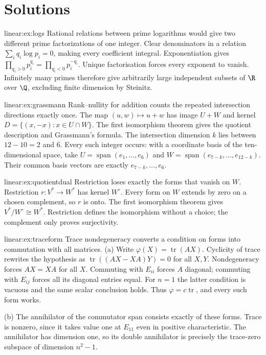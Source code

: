 \section{Solutions}
\begin{solution}{linear:ex:logs}
\idea Rational relations between prime logarithms would give two different prime factorizations of one integer.
\writeup Clear denominators in a relation $\sum_iq_i\log p_i=0$, making every coefficient integral. Exponentiation gives $\prod_{q_i>0}p_i^{q_i}=\prod_{q_i<0}p_i^{-q_i}$. Unique factorisation forces every exponent to vanish. Infinitely many primes therefore give arbitrarily large independent subsets of $\R$ over $\Q$, excluding finite dimension by Steinitz.
\end{solution}
\begin{solution}{linear:ex:grassmann}
\idea Rank--nullity for addition counts the repeated intersection directions exactly once.
\writeup The map $(u,w)\mapsto u+w$ has image $U+W$ and kernel $D=\{(x,-x):x\in U\cap W\}$. The first isomorphism theorem gives the quotient description and Grassmann's formula. The intersection dimension $k$ lies between $12-10=2$ and $6$. Every such integer occurs: with a coordinate basis of the ten-dimensional space, take $U=\operatorname{span}(e_1,\ldots,e_6)$ and $W=\operatorname{span}(e_{7-k},\ldots,e_{12-k})$. Their common basis vectors are exactly $e_{7-k},\ldots,e_6$.
\end{solution}
\begin{solution}{linear:ex:quotientdual}
\idea Restriction loses exactly the forms that vanish on $W$.
\writeup Restriction $r:V^*\to W^*$ has kernel $W^\circ$. Every form on $W$ extends by zero on a chosen complement, so $r$ is onto. The first isomorphism theorem gives $V^*/W^\circ\cong W^*$. Restriction defines the isomorphism without a choice; the complement only proves surjectivity.
\end{solution}
\begin{solution}{linear:ex:traceform}
\idea Trace nondegeneracy converts a condition on forms into commutation with all matrices.
\writeup (a) Write $\varphi(X)=\operatorname{tr}(AX)$. Cyclicity of trace rewrites the hypothesis as $\operatorname{tr}((AX-XA)Y)=0$ for all $X,Y$. Nondegeneracy forces $AX=XA$ for all $X$. Commuting with $E_{ii}$ forces $A$ diagonal; commuting with $E_{ij}$ forces all its diagonal entries equal. For $n=1$ the latter condition is vacuous and the same scalar conclusion holds. Thus $\varphi=c\operatorname{tr}$, and every such form works.

(b) The annihilator of the commutator span consists exactly of these forms. Trace is nonzero, since it takes value one at $E_{11}$ even in positive characteristic. The annihilator has dimension one, so its double annihilator is precisely the trace-zero subspace of dimension $n^2-1$.
\end{solution}
